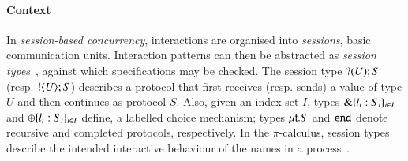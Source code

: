 \documentclass[preprint,11pt]{elsarticle}
\begin{document}
\paragraph{Context}
In \emph{session-based concurrency}, interactions are organised into \emph{sessions}, basic communication units.
Interaction patterns can then be abstracted as \emph{session types}~\cite{honda.vasconcelos.kubo:language-primitives}, against which  specifications may be checked. 
The session type $? (U) ; S$ (resp.  $! \langle U \rangle ; S$)
describes a protocol that first receives (resp. sends) a value of type $U$ and then continues as protocol $S$.
Also, given an index set $I$, types $\& \{l_i:S_i\}_{i \in I}$ 
and $\oplus \{l_i:S_i\}_{i \in I}$ 
define, %
 a labelled choice mechanism; types 
$\mu\mathsf{t}.S$ 
and 
$\mathtt{end}$ denote recursive and completed protocols, respectively.
In the %
$\pi$-calculus, %
session types describe the intended interactive behaviour of the names %
in a process~\cite{honda.vasconcelos.kubo:language-primitives}.

\end{document}
